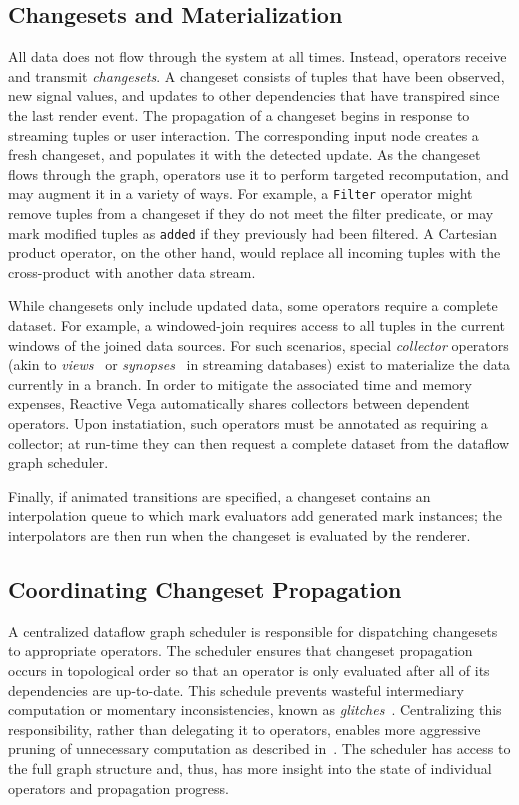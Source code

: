 \subsection{Changesets and Materialization}

All data does not flow through the system at all times. Instead, operators
receive and transmit \emph{changesets}. A changeset consists of tuples that have
been observed, new signal values, and updates to other dependencies that have
transpired since the last render event. The propagation of a changeset begins in
response to streaming tuples or user interaction. The corresponding input node
creates a fresh changeset, and populates it with the detected update. As the
changeset flows through the graph, operators use it to perform targeted
recomputation, and may augment it in a variety of ways. For example, a
\texttt{Filter} operator might remove tuples from a changeset if they do not
meet the filter predicate, or may mark modified tuples as \texttt{added} if they
previously had been filtered. A Cartesian product operator, on the other hand,
would replace all incoming tuples with the cross-product with another data
stream.

While changesets only include updated data, some operators require a complete
dataset. For example, a windowed-join requires access to all tuples in the
current windows of the joined data sources. For such scenarios, special
\emph{collector} operators (akin to \emph{views}~\cite{abadi:aurora} or
\emph{synopses}~\cite{arasu:stream} in streaming databases) exist to
materialize the data currently in a branch. In order to mitigate the
associated time and memory expenses, Reactive Vega automatically shares
collectors between dependent operators. Upon instatiation, such operators must
be annotated as requiring a collector; at run-time they can then request a
complete dataset from the dataflow graph scheduler.

Finally, if animated transitions are specified, a changeset contains an
interpolation queue to which mark evaluators add generated mark instances; the
interpolators are then run when the changeset is evaluated by the renderer.

\subsection{Coordinating Changeset Propagation}
\label{sec:propagation}

A centralized dataflow graph scheduler is responsible for dispatching changesets
to appropriate operators. The scheduler ensures that changeset propagation
occurs in topological order so that an operator is only evaluated after all of
its dependencies are up-to-date. This schedule prevents wasteful intermediary
computation or momentary inconsistencies, known as
\emph{glitches}~\cite{cooper:embedding}. Centralizing this responsibility,
rather than delegating it to operators, enables more aggressive pruning of
unnecessary computation as described in~. The scheduler has
access to the full graph structure and, thus, has more insight into the state of
individual operators and propagation progress.


